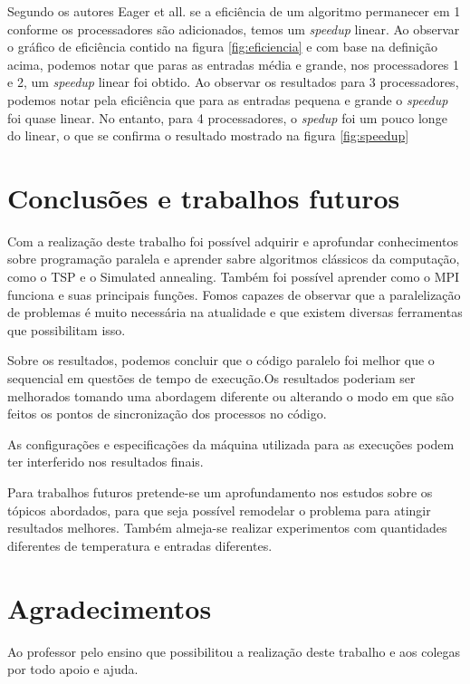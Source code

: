 \documentclass[journal]{IEEEtran}
\begin{document}
Segundo os autores Eager et all. se a eficiência de um algoritmo permanecer em 1 conforme os processadores são adicionados, temos um \textit{speedup} linear. Ao observar o gráfico de eficiência contido na figura \ref{fig:eficiencia} e com base na definição acima, podemos notar que paras as entradas média e grande, nos processadores 1 e 2, um \textit{speedup} linear foi obtido. Ao observar os resultados para 3 processadores, podemos notar pela eficiência que para as entradas pequena e grande o \textit{speedup} foi quase linear. No entanto, para 4 processadores, o \textit{spedup} foi um pouco longe do linear, o que se confirma o resultado mostrado na figura \ref{fig:speedup}

\section{Conclusões e trabalhos futuros}
Com a realização deste trabalho foi possível adquirir e aprofundar conhecimentos sobre programação paralela e aprender sabre algoritmos clássicos da computação, como o TSP e o Simulated annealing. Também foi possível aprender como o MPI funciona e suas principais funções. Fomos capazes de observar que a paralelização de problemas é muito necessária na atualidade e que existem diversas ferramentas que possibilitam isso.

Sobre os resultados, podemos concluir que o código paralelo foi melhor que o sequencial em questões de tempo de execução.Os resultados poderiam ser melhorados tomando uma abordagem diferente ou alterando o modo em que são feitos os pontos de sincronização dos processos no código.

As configurações e especificações da máquina utilizada para as execuções podem ter interferido nos resultados finais.

Para trabalhos futuros pretende-se um aprofundamento nos estudos sobre os tópicos abordados, para que seja possível remodelar o problema para atingir resultados melhores. Também almeja-se realizar experimentos com quantidades diferentes de temperatura e entradas diferentes.

\section*{Agradecimentos}
Ao professor pelo ensino que possibilitou a realização deste trabalho e aos colegas por todo apoio e ajuda.



\ifCLASSOPTIONcaptionsoff
  \newpage
\fi
\end{document}
